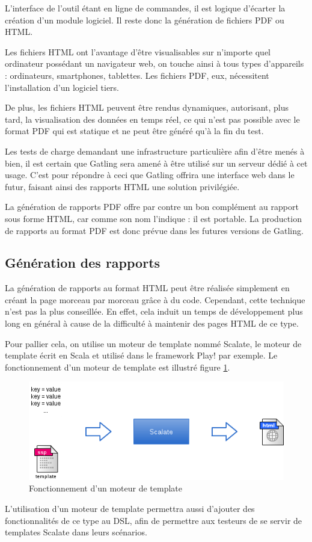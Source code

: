 L'interface de l'outil étant en ligne de commandes, il est logique d'écarter la création d'un module logiciel. Il reste donc la génération de fichiers PDF ou HTML.

Les fichiers HTML ont l'avantage d'être visualisables sur n'importe quel ordinateur possédant un navigateur web, on touche ainsi à tous types d'appareils : ordinateurs, smartphones, tablettes. Les fichiers PDF, eux, nécessitent l'installation d'un logiciel tiers.

De plus, les fichiers HTML peuvent être rendus dynamiques, autorisant, plus tard, la visualisation des données en temps réel, ce qui n'est pas possible avec le format PDF qui est statique et ne peut être généré qu'à la fin du test.

Les tests de charge demandant une infrastructure particulière afin d'être menés à bien, il est certain que Gatling sera amené à être utilisé sur un serveur dédié à cet usage. C'est pour répondre à ceci que Gatling offrira une interface web dans le futur, faisant ainsi des rapports HTML une solution privilégiée.

La génération de rapports PDF offre par contre un bon complément au rapport sous forme HTML, car comme son nom l'indique : il est portable. La production de rapports au format PDF est donc prévue dans les futures versions de Gatling.

\subsection{Génération des rapports}
\label{sec_scalate}

La génération de rapports au format HTML peut être réalisée simplement en créant la page morceau par morceau grâce à du code. Cependant, cette technique n'est pas la plus conseillée. En effet, cela induit un temps de développement plus long en général à cause de la difficulté à maintenir des pages HTML de ce type.

Pour pallier cela, on utilise un moteur de template nommé Scalate\cite{www_scalate}, le moteur de template écrit en Scala et utilisé dans le framework Play! par exemple. Le fonctionnement d'un moteur de template est illustré figure \ref{scalate}.

\begin{figure}[h]
\begin{center}
\includegraphics[width=400pt]{img/scalate.png}
\end{center}
\caption{Fonctionnement d'un moteur de template}
\label{scalate}
\end{figure}

L'utilisation d'un moteur de template permettra aussi d'ajouter des fonctionnalités de ce type au DSL, afin de permettre aux testeurs de se servir de templates Scalate dans leurs scénarios.